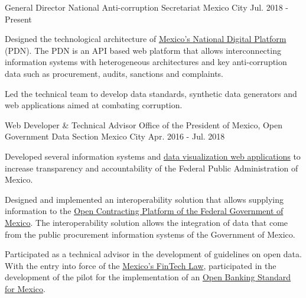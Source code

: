 

\begin{cventries}

  \cventry
    {General Director} %
    {National Anti-corruption Secretariat} %
    {Mexico City} %
    {Jul. 2018 - Present} %
    {
      \begin{cvitems} %
        \item Designed the technological architecture of \href{https://www.plataformadigitalnacional.org}{Mexico's National Digital Platform} (PDN).
        The PDN is an API based web platform
        that allows interconnecting information systems with heterogeneous architectures and key anti-corruption data such as procurement, audits,
        sanctions and complaints.
        \item Led the technical team to develop data standards, synthetic data generators and web applications aimed at combating corruption.
      \end{cvitems}
    }

  \cventry
    {Web Developer \& Technical Advisor} %
    {Office of the President of Mexico, Open Government Data Section} %
    {Mexico City} %
    {Apr. 2016 - Jul. 2018} %
    {
      \begin{cvitems} %
        \item Developed several information systems and \href{https://datos.gob.mx/nuevoaeropuerto/}{data visualization web applications} to
	increase transparency and accountability of the Federal Public Administration of Mexico.
	      \item Designed and implemented an interoperability solution that allows supplying information to the \href{https://www.gob.mx/contratacionesabiertas}{Open Contracting Platform of the Federal Government of Mexico}. The interoperability solution allows the integration of data that come from the public procurement information systems of the Government of Mexico.
	      \item Participated as a technical advisor in the development of guidelines on open data. With the entry into force of the 
	      \href{http://www.dof.gob.mx/nota_detalle.php?codigo=5515623&fecha=09/03/2018}{Mexico's FinTech Law}, participated in the development of the pilot for the implementation of an \href{https://datos.gob.mx/blog/estandar-bancario-abierto-un-estandar-para-migrar-la-banca-a-la-economia-digital-del-siglo-xxi}{Open Banking Standard for Mexico}.
      \end{cvitems}
    }


\end{cventries}
